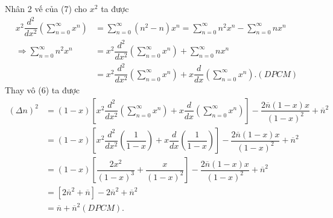 \documentclass{article}
\newcommand{\f}[2]{\dfrac{#1}{#2}}
\begin{document}
Nhân 2 vế của (7) cho $x^2$ ta được
\begin{align*}
	x^2 \f{d^2}{dx^2} \left( \sum_{n = 0}^{\infty} x^{n} \right)
	 & = \sum_{n = 0}^{\infty} (n^2-n) x^{n}
	= \sum_{n = 0}^{\infty} n^2 x^{n} - \sum_{n = 0}^{\infty} nx^{n}                                                                           \\
	\Rightarrow \sum_{n = 0}^{\infty} n^2 x^{n}
	 & = x^2 \f{d^2}{dx^2} \left( \sum_{n = 0}^{\infty} x^{n} \right) + \sum_{n = 0}^{\infty} nx^{n}                                           \\
	 & = x^2 \f{d^2}{dx^2} \left( \sum_{n = 0}^{\infty} x^{n} \right) + x \f{d}{dx} \left( \sum_{n = 0}^{\infty} x^{n} \right) .(DPCM) \tag{8}
\end{align*}
Thay vô (6) ta được
\begin{align*}
	(\Delta n)^2
	 & = (1-x) \left[x^2 \f{d^2}{dx^2} \left( \sum_{n = 0}^{\infty} x^{n} \right) + x \f{d}{dx} \left( \sum_{n = 0}^{\infty} x^{n} \right)\right] - \f{2\overline{n}(1-x)x}{(1 - x)^2} + \overline{n}^2 \\
	 & = (1-x) \left[x^2 \f{d^2}{dx^2} \left( \f{1}{1 - x} \right) + x \f{d}{dx} \left( \f{1}{1 - x} \right)\right] - \f{2\overline{n}(1-x)x}{(1 - x)^2} + \overline{n}^2                               \\
	 & = (1-x) \left[\f{2x^2}{(1-x)^3} + \f{x}{(1 - x)^2}\right] - \f{2\overline{n}(1-x)x}{(1 - x)^2} + \overline{n}^2                                                                                  \\
	 & = \left[2 \overline{n}^2 + \overline{n}\right] - 2 \overline{n}^2 + \overline{n}^2                                                                                                               \\
	 & = \overline{n} + \overline{n}^2 (DPCM).\tag{9}
\end{align*}
\end{document}
